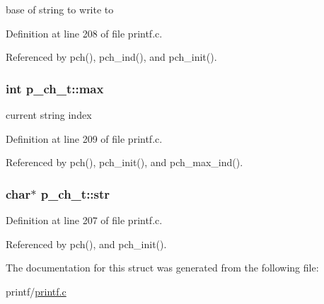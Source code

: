 base of string to write to 



Definition at line 208 of file printf.\+c.



Referenced by pch(), pch\+\_\+ind(), and pch\+\_\+init().

\subsubsection[{\texorpdfstring{max}{max}}]{\setlength{\rightskip}{0pt plus 5cm}int p\+\_\+ch\+\_\+t\+::max}\hypertarget{structp__ch__t_a0dee9f28e498d427e53051b7e1846d34}{}\label{structp__ch__t_a0dee9f28e498d427e53051b7e1846d34}


current string index 



Definition at line 209 of file printf.\+c.



Referenced by pch(), pch\+\_\+init(), and pch\+\_\+max\+\_\+ind().

\subsubsection[{\texorpdfstring{str}{str}}]{\setlength{\rightskip}{0pt plus 5cm}char$\ast$ p\+\_\+ch\+\_\+t\+::str}\hypertarget{structp__ch__t_aa3c8616342a2717bc714bf1b6d00516f}{}\label{structp__ch__t_aa3c8616342a2717bc714bf1b6d00516f}


Definition at line 207 of file printf.\+c.



Referenced by pch(), and pch\+\_\+init().



The documentation for this struct was generated from the following file\+:\begin{DoxyCompactItemize}
\item 
printf/\hyperlink{printf_8c}{printf.\+c}\end{DoxyCompactItemize}
